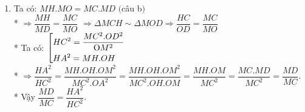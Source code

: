 \begin{ex}
{\begin{enumerate}
              $+$   Do $MH.MO = M{A^2} = MC.M{\rm{D}} \Rightarrow CHO{\rm{D}}$ nội tiếp $ \Rightarrow O,H,C,P,D$ cùng thuộc đường tròn đường kính $OP$ $\Rightarrow \widehat {OHP} = {90^0}$ mà $\widehat {OHB} = {90^0}$nên 3 điểm $A,B,P$ thẳng hàng.\\*
              $+$   Vậy khi $M$ di động trên tia $Ct$ thì $AB$ luôn đi qua điểm $P$ cố định.
        \item Ta có: $MH.MO = MC.MD$ $($câu b$)$ \\*
                    $\Rightarrow \dfrac{{MH}}{{MD}} = \dfrac{{MC}}{{MO}}$ $ \Rightarrow \Delta MCH \sim \Delta MOD \Rightarrow \dfrac{{HC}}{{OD}} = \dfrac{{MC}}{{MO}}$\\*
              Ta có: $\left[\begin{aligned}&H{C^2} = \dfrac{{M{C^2}.O{D^2}}}{{{\rm{O}}{M^2}}}\\ &H{A^2} = MH.OH\end{aligned}\right.$\\*
              $ \Rightarrow \dfrac{{H{A^2}}}{{H{C^2}}} = \dfrac{{MH.OH.O{M^2}}}{{M{C^2}.O{A^2}}} = \dfrac{{MH.OH.O{M^2}}}{{M{C^2}.OH.OM}} = \dfrac{{MH.OM}}{{M{C^2}}} = \dfrac{{MC.MD}}{{M{C^2}}} = \dfrac{{MD}}{{MC}}$.\\*
              Vậy $\dfrac{{MD}}{{MC}} = \dfrac{{H{A^2}}}{{H{C^2}}}$.
    \end{enumerate}
    }
\end{ex}

